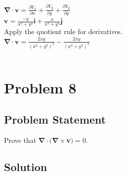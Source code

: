 \documentclass{article}
\renewcommand{\vec}[1]{\bm{#1}} %
\newcommand{\grad}{\vec{\nabla}} %
\begin{document}
    \begin{centering}
    
    $\grad \cdot \mathbf{v} = \frac{\partial V_x}{\partial x} + \frac{\partial V_y}{\partial y} + \frac{\partial V_y}{\partial y}$ \\
    $\mathbf{v} = \frac{-y}{x^2 + y^2}\mathbf{i} + \frac{x}{x^2 + y^2}\mathbf{j}$ \\
    Apply the quotient rule for derivatives. \\
    $\grad \cdot \mathbf{v} = \frac{2xy}{(x^2 + y^2)^2} - \frac{2xy}{(x^2 + y^2)^2}$ \\
    \fbox{$\grad \cdot \mathbf{v} = 0$} \\
    
    
    
    \end{centering}
    
    \pagebreak
    
    \section*{Problem 8}
    \subsection*{Problem Statement}
    Prove that $\grad \cdot ( \grad \times ${\bf v}$) = 0$.
    
    
    \subsection*{Solution}
    
\end{document}
